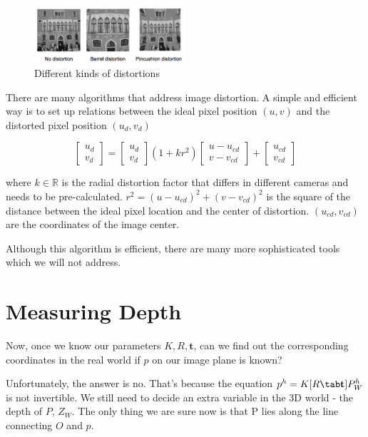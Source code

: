 \documentclass[]{article}
\begin{document}
\begin{figure}[H]
\includegraphics[width=0.5\textwidth]{distortion.png}
\centering
\caption{Different kinds of distortions}
\label{fig:distortion}
\end{figure}

There are many algorithms that address image distortion. A simple and efficient way is to set up relations between the ideal pixel position $(u,v)$ and the distorted pixel position $(u_d,v_d)$

\begin{equation}
\begin{bmatrix}
    u_d \\
    v_d
\end{bmatrix}
=
\begin{bmatrix}
    u_d \\
    v_d
\end{bmatrix}
(1+kr^2)
\begin{bmatrix}
    u-u_{cd} \\
    v-v_{cd}
\end{bmatrix}
+
\begin{bmatrix}
    u_{cd} \\
    v_{cd}
\end{bmatrix}
\end{equation}

where $k \in \mathbb{R}$ is the radial distortion factor that differs in different cameras and needs to be pre-calculated. $r^2=(u-u_{cd})^2+(v-v_{cd})^2$ is the square of the distance between the ideal pixel location and the center of distortion. $(u_{cd},v_{cd})$ are the coordinates of the image center.

Although this algorithm is efficient, there are many more sophisticated tools which we will not address.

\section{Measuring Depth}
Now, once we know our parameters $K,R,\textbf{t}$, can we find out the corresponding coordinates in the real world if $p$ on our image plane is known?

Unfortunately, the answer is no. That's because the equation $p^h=K[R\tab \textbf{t}]P_W^h$ is not invertible. We still need to decide an extra variable in the 3D world - the depth of $P$, $Z_W$. The only thing we are sure now is that P lies along the line connecting $O$ and $p$.
\end{document}
